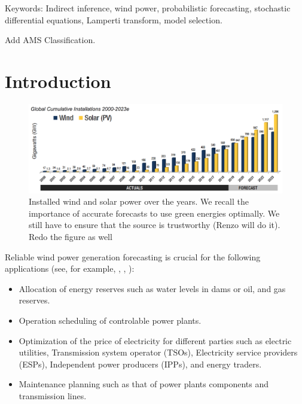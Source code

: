 \documentclass[11pt]{article}
\begin{document}
{\color{red}Keywords: Indirect inference, wind power, probabilistic forecasting, stochastic differential equations, Lamperti transform, model selection.}

{\color{red} Add AMS Classification.}



\section{Introduction}  \label{Section_1}

\begin{figure}
  \includegraphics[width=120mm,scale=1]{plots/1.png}
  \caption{Installed wind and solar power over the years. We recall the importance of accurate forecasts to use green energies optimally. {\color{red} We still have to ensure that the source is trustworthy (Renzo will do it)}. Redo the figure as well}
\end{figure}Reliable wind power generation forecasting is crucial for the following applications (see, for example, \cite[5]{gieb}, \cite[162]{chang}, \cite{zhbo}):
\begin{itemize}
\item Allocation of energy reserves such as water levels in dams or oil, and gas reserves.
\item Operation scheduling of controlable power plants.
\item Optimization of the price of electricity for different parties such as electric utilities, Transmission system operator (TSOs), Electricity service providers (ESPs), Independent power producers (IPPs), and energy traders.
\item Maintenance planning such as that of power plants components and transmission lines.

\end{itemize}
\end{document}
